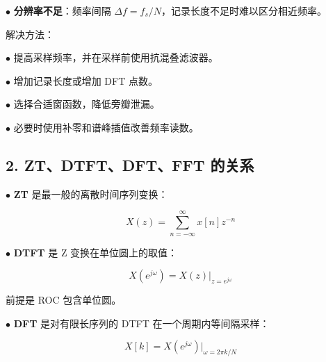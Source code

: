 \documentclass[11pt]{ctexart}
\begin{document}
\noindent\(\bullet\) \textbf{分辨率不足}：频率间隔 \(\Delta f=f_s/N\)，记录长度不足时难以区分相近频率。\par



解决方法：\par



\noindent\(\bullet\) 提高采样频率，并在采样前使用抗混叠滤波器。\par

\noindent\(\bullet\) 增加记录长度或增加 DFT 点数。\par

\noindent\(\bullet\) 选择合适窗函数，降低旁瓣泄漏。\par

\noindent\(\bullet\) 必要时使用补零和谱峰插值改善频率读数。\par



\subsection*{2. ZT、DTFT、DFT、FFT 的关系}



\noindent\(\bullet\) \textbf{ZT} 是最一般的离散时间序列变换：\par



\[

  X(z)=\sum_{n=-\infty}^{\infty}x[n]z^{-n}

  \]



\noindent\(\bullet\) \textbf{DTFT} 是 Z 变换在单位圆上的取值：\par



\[

  X(e^{j\omega})=X(z)\big|_{z=e^{j\omega}}

  \]



前提是 ROC 包含单位圆。\par



\noindent\(\bullet\) \textbf{DFT} 是对有限长序列的 DTFT 在一个周期内等间隔采样：\par



\[

  X[k]=X(e^{j\omega})\big|_{\omega=2\pi k/N}

  \]
\end{document}

